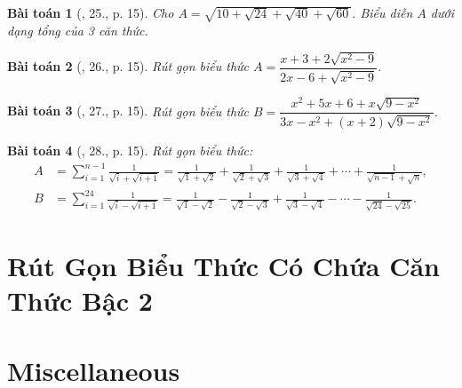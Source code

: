 \documentclass{article}
\newtheorem{baitoan}{Bài toán}
\begin{document}
\begin{baitoan}[\cite{Binh_Toan_9_tap_1}, 25., p. 15]
	Cho $A = \sqrt{10 + \sqrt{24} + \sqrt{40} + \sqrt{60}}$. Biểu diễn $A$ dưới dạng tổng của 3 căn thức.
\end{baitoan}

\begin{baitoan}[\cite{Binh_Toan_9_tap_1}, 26., p. 15]
	Rút gọn biểu thức $A = \dfrac{x + 3 + 2\sqrt{x^2 - 9}}{2x - 6 + \sqrt{x^2 - 9}}$.
\end{baitoan}

\begin{baitoan}[\cite{Binh_Toan_9_tap_1}, 27., p. 15]
	Rút gọn biểu thức $B = \dfrac{x^2 + 5x + 6 + x\sqrt{9 - x^2}}{3x - x^2 + (x + 2)\sqrt{9 - x^2}}$.
\end{baitoan}

\begin{baitoan}[\cite{Binh_Toan_9_tap_1}, 28., p. 15]
	Rút gọn biểu thức:
	\begin{align*}
		A &= \sum_{i=1}^{n-1} \frac{1}{\sqrt{i} + \sqrt{i + 1}} = \frac{1}{\sqrt{1} + \sqrt{2}} + \frac{1}{\sqrt{2} + \sqrt{3}} + \frac{1}{\sqrt{3} + \sqrt{4}} + \cdots + \frac{1}{\sqrt{n - 1} + \sqrt{n}},\\
		B &= \sum_{i=1}^{24} \frac{1}{\sqrt{i} - \sqrt{i + 1}} = \frac{1}{\sqrt{1} - \sqrt{2}} - \frac{1}{\sqrt{2} - \sqrt{3}} + \frac{1}{\sqrt{3} - \sqrt{4}} - \cdots - \frac{1}{\sqrt{24} - \sqrt{25}}.
	\end{align*}
\end{baitoan}


\section{Rút Gọn Biểu Thức Có Chứa Căn Thức Bậc 2}


\section{Miscellaneous}


\printbibliography[heading=bibintoc]
	
\end{document}
